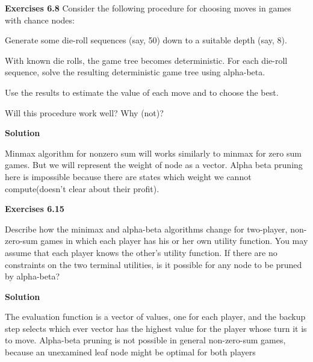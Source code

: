 \documentclass[12pt]{article}
\theoremstyle{definiton}
\theoremstyle{definition}
\theoremstyle{definition}
\begin{document}
\bigskip
	
		\textbf{Exercises 6.8}
		Consider the following procedure for choosing moves in games with chance nodes:
		
\begin{list}{) ~}{}
\item Generate some die-roll sequences (say, 50) down to a suitable depth (say, 8).
\item With known die rolls, the game tree becomes deterministic. For each die-roll sequence, solve the resulting deterministic game tree using alpha-beta.
\item Use the results to estimate the value of each move and to choose the best.
\end{list}
Will this procedure work well? Why (not)?	
		
		\medskip
		
		\textbf{Solution}
		
Minmax algorithm for nonzero sum will works similarly to minmax for zero sum games. But we will represent the weight of node as a vector. Alpha beta pruning here is impossible because there are states which weight we cannot compute(doesn't clear about their profit).		

\bigskip
	
		\textbf{Exercises 6.15}
		
		Describe how the minimax and alpha-beta algorithms change for two-player, non-zero-sum games in which each player has his or her own utility function. You may assume that each player knows the other's utility function. If there are no constraints on the two terminal utilities, is it possible for any node to be pruned by alpha-beta?
		
		\medskip
		
		\textbf{Solution}
		
		The evaluation function is a vector of values, one for each player, and the backup step selects which ever vector has the highest value for the player whose turn it is to move. Alpha-beta pruning is not possible in general non-zero-sum games, because an unexamined leaf node might be optimal for both players
			
\end{document}
